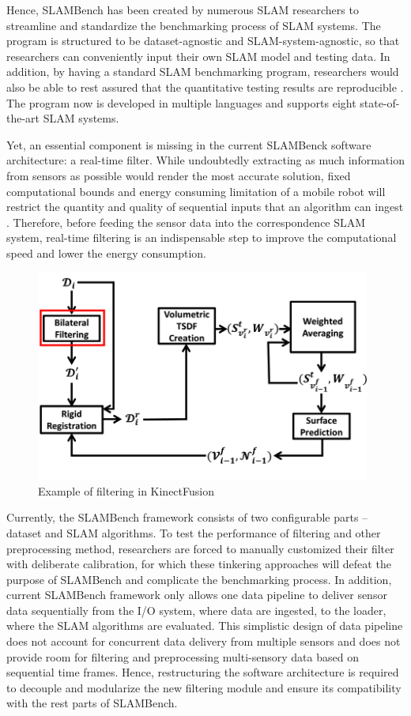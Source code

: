 Hence, SLAMBench has been created by numerous SLAM researchers to streamline and standardize the benchmarking process of SLAM systems. 
The program is structured to be dataset-agnostic and SLAM-system-agnostic, so that researchers can conveniently input their own SLAM model and testing data. 
In addition, by having a standard SLAM benchmarking program, researchers would also be able to rest assured that the quantitative testing results are reproducible \cite{bodin2018slambench2}. 
The program now is developed in multiple languages and supports eight state-of-the-art SLAM systems.

Yet, an essential component is missing in the current SLAMBenck software architecture: a real-time filter. 
While undoubtedly extracting as much information from sensors as possible would render the most accurate solution, fixed computational bounds and energy consuming limitation of a mobile robot will restrict the quantity and quality of sequential inputs that an algorithm can ingest \cite{strasdat2010real}. 
Therefore, before feeding the sensor data into the correspondence SLAM system, real-time filtering is an indispensable step to improve the computational speed and lower the energy consumption. 

\begin{figure}[h]
	\caption{Example of filtering in KinectFusion \cite{afzal2014kinect}}
	\includegraphics[width=11cm]{figures/kinectfusion.png}
	\centering
\end{figure}

Currently, the SLAMBench framework consists of two configurable parts – dataset and SLAM algorithms. 
To test the performance of filtering and other preprocessing method, researchers are forced to manually customized their filter with deliberate calibration, for which these tinkering approaches will defeat the purpose of SLAMBench and complicate the benchmarking process. 
In addition, current SLAMBench framework only allows one data pipeline to deliver sensor data sequentially from the I/O system, where data are ingested, to the loader, where the SLAM algorithms are evaluated. 
This simplistic design of data pipeline does not account for concurrent data delivery from multiple sensors and does not provide room for filtering and preprocessing multi-sensory data based on sequential time frames. 
Hence, restructuring the software architecture is required to decouple and modularize the new filtering module and ensure its compatibility with the rest parts of SLAMBench.


